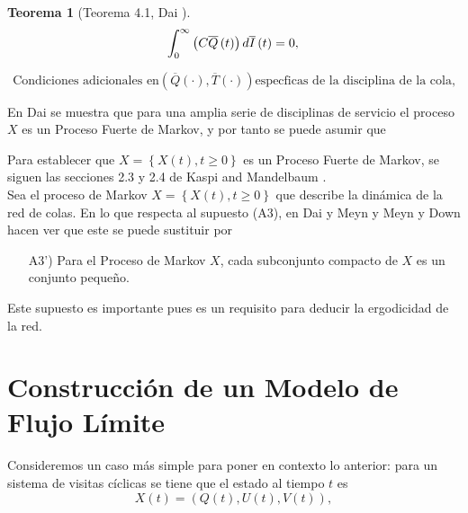 \documentclass{article}
\newtheorem{Teo}{Teorema}
\begin{document}
\begin{Teo}[Teorema 4.1, Dai \cite{Dai}]
\begin{equation}\label{Eq.MF.5.3a}
\int_{0}^{\infty}\left(C\overline{Q}\left(t\right)\right)d\overline{I}\left(t\right)=0,\\
\end{equation}

\begin{equation}\label{Eq.MF.6.3a}
\textrm{Condiciones adicionales en
}\left(\overline{Q}\left(\cdot\right),\overline{T}\left(\cdot\right)\right)\textrm{
especficas de la disciplina de la cola,}
\end{equation}
\end{Teo}


En Dai \cite{Dai} se muestra que para una amplia serie de disciplinas
de servicio el proceso $X$ es un Proceso Fuerte de
Markov, y por tanto se puede asumir que


Para establecer que $X=\left\{X\left(t\right),t\geq0\right\}$ es
un Proceso Fuerte de Markov, se siguen las secciones 2.3 y 2.4 de Kaspi and Mandelbaum \cite{KaspiMandelbaum}. \\

Sea el proceso de Markov $X=\left\{X\left(t\right),t\geq0\right\}$
que describe la din\'amica de la red de colas. En lo que respecta
al supuesto (A3), en Dai y Meyn \cite{DaiSean} y Meyn y Down
\cite{MeynDown} hacen ver que este se puede sustituir por

\begin{itemize}
\item[A3')] Para el Proceso de Markov $X$, cada subconjunto
compacto de $X$ es un conjunto peque\~no.
\end{itemize}

Este supuesto es importante pues es un requisito para deducir la ergodicidad de la red.
\section{Construcci\'on de un Modelo de Flujo L\'imite}

Consideremos un caso m\'as simple para poner en contexto lo
anterior: para un sistema de visitas c\'iclicas se tiene que el
estado al tiempo $t$ es
\begin{equation}
X\left(t\right)=\left(Q\left(t\right),U\left(t\right),V\left(t\right)\right),
\end{equation}
\end{document}
